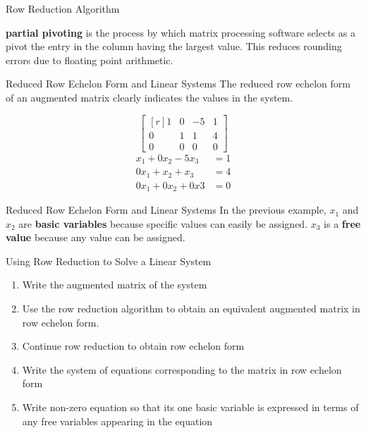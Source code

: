 \documentclass{beamer}
\begin{document}
\begin{frame}{Row Reduction Algorithm}
  \begin{definition}
    \textbf{partial pivoting} is the process by which matrix processing software selects as
    a pivot the entry in the column having the largest value. This reduces rounding errors
    due to floating point arithmetic.
  \end{definition}
\end{frame}

\begin{frame}{Reduced Row Echelon Form and Linear Systems}
  The reduced row echelon form of an augmented matrix clearly indicates the values in
  the system.
  \begin{example}
    \[
    \begin{bmatrix*}[r]
      1 & 0 & -5 & 1 \\
      0 & 1 & 1  & 4 \\
      0 & 0 & 0  & 0
    \end{bmatrix*}
    \]
    \begin{equation}
      \begin{split}
        x_{1}  + 0x_{2} - 5x_{3} &= 1 \\
        0x_{1} + x_{2}  + x_{3} &= 4 \\
        0x_{1} + 0x_{2} + 0x{3} &= 0 
      \end{split}
    \end{equation}
  \end{example}
\end{frame}

\begin{frame}{Reduced Row Echelon Form and Linear Systems}
  In the previous example, $x_{1}$ and $x_{2}$ are \textbf{basic variables} because specific
  values can easily be assigned. $x_{3}$ is a \textbf{free value} because any value can be assigned.
\end{frame}

\begin{frame}{Using Row Reduction to Solve a Linear System}
  \begin{enumerate}
    \item Write the augmented matrix of the system
    \item Use the row reduction algorithm to obtain an equivalent augmented matrix in row echelon form.
    \item Continue row reduction to obtain row echelon form
    \item Write the system of equations corresponding to the matrix in row echelon form 
    \item Write non-zero equation so that its one basic variable is expressed in terms of any free variables appearing in the equation
  \end{enumerate}
\end{frame}
\end{document}
